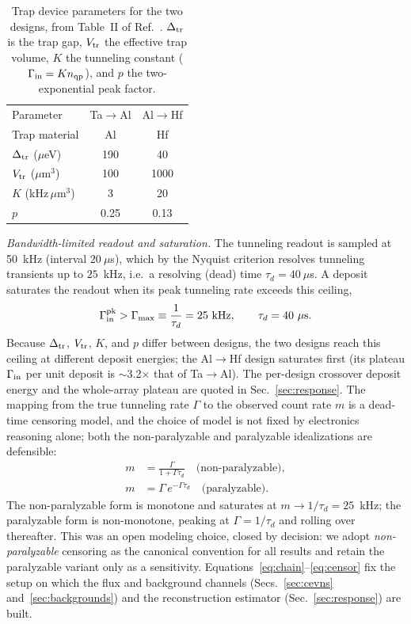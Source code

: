 \begin{table}[t]
\caption{Trap device parameters for the two designs, from Table~II of Ref.~\cite{ramanathan2026}. $\Delta_{\rm tr}$ is the trap gap, $V_{\rm tr}$ the effective trap volume, $K$ the tunneling constant ($\Gamma_{\rm in}=K n_{\rm qp}$), and $p$ the two-exponential peak factor.}
\label{tab:designs}
\begin{ruledtabular}
\begin{tabular}{lcc}
Parameter & Ta$\to$Al & Al$\to$Hf \\
\colrule
Trap material & Al & Hf \\
$\Delta_{\rm tr}$ ($\mu$eV) & 190 & 40 \\
$V_{\rm tr}$ ($\mu$m$^3$) & 100 & 1000 \\
$K$ (kHz\,$\mu$m$^3$) & 3 & 20 \\
$p$ & 0.25 & 0.13 \\
\end{tabular}
\end{ruledtabular}
\end{table}

\emph{Bandwidth-limited readout and saturation.} The tunneling readout is sampled at 50~kHz (interval $20~\mu$s), which by the Nyquist criterion resolves tunneling transients up to $25$~kHz, i.e.\ a resolving (dead) time $\tau_d = 40~\mu$s. A deposit saturates the readout when its peak tunneling rate exceeds this ceiling,
\begin{equation}
\Gamma_{\rm in}^{\rm pk} > \Gamma_{\rm max} \equiv \frac{1}{\tau_d} = 25~\text{kHz},
\qquad \tau_d = 40~\mu\text{s}.
\label{eq:sat}
\end{equation}
Because $\Delta_{\rm tr}$, $V_{\rm tr}$, $K$, and $p$ differ between designs, the two designs reach this ceiling at different deposit energies; the Al$\to$Hf design saturates first (its plateau $\Gamma_{\rm in}$ per unit deposit is $\sim$3.2$\times$ that of Ta$\to$Al). The per-design crossover deposit energy and the whole-array plateau are quoted in Sec.~\ref{sec:response}. The mapping from the true tunneling rate $\Gamma$ to the observed count rate $m$ is a dead-time censoring model, and the choice of model is not fixed by electronics reasoning alone; both the non-paralyzable and paralyzable idealizations are defensible:
\begin{equation}
\begin{aligned}
m &= \frac{\Gamma}{1+\Gamma\tau_d}\quad\text{(non-paralyzable)},\\
m &= \Gamma\,e^{-\Gamma\tau_d}\quad\text{(paralyzable)}.
\end{aligned}
\label{eq:censor}
\end{equation}
The non-paralyzable form is monotone and saturates at $m\to 1/\tau_d = 25$~kHz; the paralyzable form is non-monotone, peaking at $\Gamma = 1/\tau_d$ and rolling over thereafter. This was an open modeling choice, closed by decision: we adopt \emph{non-paralyzable} censoring as the canonical convention for all results and retain the paralyzable variant only as a sensitivity. Equations~\eqref{eq:chain}--\eqref{eq:censor} fix the setup on which the flux and background channels (Secs.~\ref{sec:cevns} and~\ref{sec:backgrounds}) and the reconstruction estimator (Sec.~\ref{sec:response}) are built.
